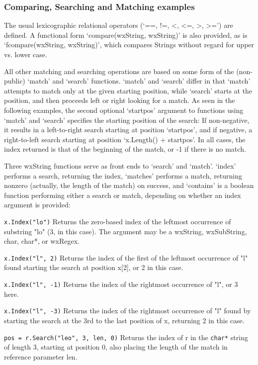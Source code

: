 \subsubsection{Comparing, Searching and Matching examples}

The usual lexicographic relational operators (`==, !=, <, <=, >, >=')
are defined. A functional form `compare(wxString, wxString)' is also
provided, as is `fcompare(wxString, wxString)', which compares Strings
without regard for upper vs. lower case.

All other matching and searching operations are based on some form
of the (non-public) `match' and `search' functions.  `match' and
`search' differ in that `match' attempts to match only at the given
starting position, while `search' starts at the position, and then
proceeds left or right looking for a match.  As seen in the following
examples, the second optional `startpos' argument to functions using
`match' and `search' specifies the starting position of the search: If
non-negative, it results in a left-to-right search starting at position
`startpos', and if negative, a right-to-left search starting at
position `x.Length() + startpos'. In all cases, the index returned is
that of the beginning of the match, or -1 if there is no match.

Three wxString functions serve as front ends to `search' and `match'.
`index' performs a search, returning the index, `matches' performs a
match, returning nonzero (actually, the length of the match) on success,
and `contains' is a boolean function performing either a search or
match, depending on whether an index argument is provided:

{\tt x.Index("lo")} 
Returns the zero-based index of the leftmost occurrence of
substring "lo" (3, in this case).  The argument may be a wxString,
wxSubString, char, char*, or wxRegex.

{\tt x.Index("l", 2)} 
Returns the index of the first of the leftmost occurrence of "l"
found starting the search at position x[2], or 2 in this case.

{\tt x.Index("l", -1)} 
Returns the index of the rightmost occurrence of "l", or 3 here.

{\tt x.Index("l", -3)} 
Returns the index of the rightmost occurrence of "l" found by
starting the search at the 3rd to the last position of x,
returning 2 in this case.

{\tt pos = r.Search("leo", 3, len, 0)} 
Returns the index of r in the {\tt char*} string of length 3, starting
at position 0, also placing the  length of the match in reference
parameter len.

